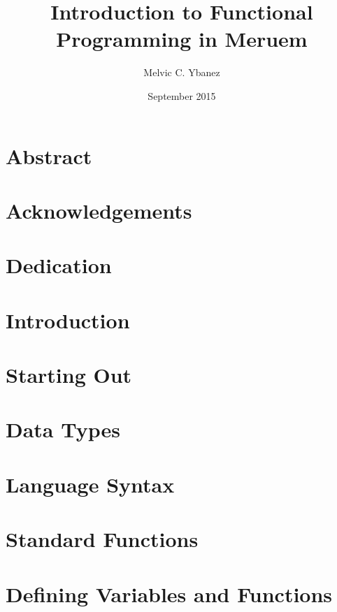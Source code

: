 \documentclass[12pt, obeyspaces]{report}
\title{Introduction to Functional Programming in Meruem}
\author{Melvic C. Ybanez}
\date{September 2015}
\begin{document}
	

	
	\chapter*{Abstract}
	
		
	\chapter*{Acknowledgements}
	
	
	\chapter*{Dedication}
	
	
	\tableofcontents
			
	\chapter*{Introduction}
		
	
	\cleardoublepage{}
	
	\chapter{Starting Out}
	
	
	\chapter{Data Types}
	
	
	\chapter{Language Syntax}
	
	
	\chapter{Standard Functions}
	\label{ch:standard-functions}
	
	
	\chapter{Defining Variables and Functions}
	
	
\end{document}
